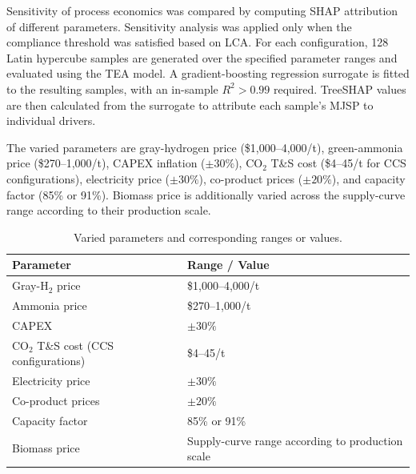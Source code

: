 
Sensitivity of process economics was compared by computing SHAP attribution of different parameters. Sensitivity analysis was applied only when the compliance threshold was satisfied based on LCA. For each configuration, 128 Latin hypercube samples are generated over the specified parameter ranges and evaluated using the TEA model. A gradient-boosting regression surrogate is fitted to the resulting samples, with an in-sample \(R^2>0.99\) required. TreeSHAP values are then calculated from the surrogate to attribute each sample's MJSP to individual drivers.

The varied parameters are gray-hydrogen price (\$1,000--4,000/t), green-ammonia price (\$270--1,000/t), CAPEX inflation (\(\pm30\%\)), CO$_2$ T\&S cost (\$4--45/t for CCS configurations), electricity price (\(\pm30\%\)), co-product prices (\(\pm20\%\)), and capacity factor (85\% or 91\%). Biomass price is additionally varied across the supply-curve range according to their production scale.

\begin{table}[htbp]
\centering
\caption{Varied parameters and corresponding ranges or values.}
\label{tab:varied_parameters}
\begin{tabular}{ll}
\hline
\textbf{Parameter} & \textbf{Range / Value} \\
\hline
Gray-H$_2$ price & \$1,000--4,000/t \\
Ammonia price & \$270--1,000/t \\
CAPEX & $\pm 30\%$ \\
CO$_2$ T\&S cost (CCS configurations) & \$4--45/t \\
Electricity price & $\pm 30\%$ \\
Co-product prices & $\pm 20\%$ \\
Capacity factor & 85\% or 91\% \\
Biomass price & Supply-curve range according to production scale \\
\hline
\end{tabular}
\end{table}
